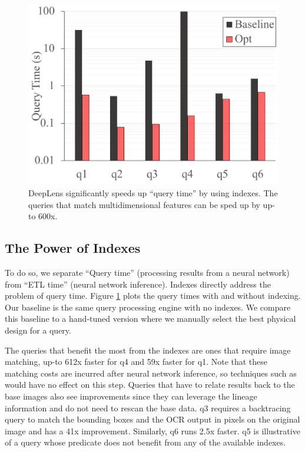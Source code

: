 \begin{figure}[t]
\centering
 \includegraphics[width=0.7\columnwidth]{figures/query.png}
 \caption{\textsf{DeepLens} significantly speeds up ``query time'' by using indexes. The queries that match multidimensional features can be sped up by up-to 600x.  \label{query} }
\end{figure}

\subsection{The Power of Indexes}
To do so, we separate ``Query time'' (processing results from a neural network) from ``ETL time'' (neural network inference). 
Indexes directly address the problem of query time.
Figure \ref{query} plots the query times with and without indexing.
Our baseline is the same query processing engine with no indexes.
We compare this baseline to a hand-tuned version where we manually select the best physical design for a query.

The queries that benefit the most from the indexes are ones that require image matching, up-to 612x faster for q4 and 59x faster for q1. Note that these matching costs are incurred after neural network inference, so techniques such as~\cite{kang2017noscope, anderson2018predicate, kang2018blazeit} would have no effect on this step.
Queries that have to relate results back to the base images also see improvements since they can leverage the lineage information and do not need to rescan the base data.
q3 requires a backtracing query to match the bounding boxes and the OCR output in pixels on the original image and has a 41x improvement. Similarly, q6 runs 2.5x faster. q5 is illustrative of a query whose predicate does not benefit from any of the available indexes.


